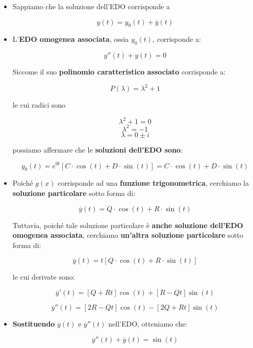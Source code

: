 \documentclass[a4paper, 12pt]{report}
\begin{document}
\begin{itemize}
        \begin{itemize}
            \item Sappiamo che la soluzione dell'EDO corrisponde a
            
            \[ y(t) = y_0(t) + \overline{y}(t)\]
            
            \item  L'\textbf{EDO omogenea associata}, ossia $y_0(t)$, corrisponde a:
            
            \[y''(t)+y(t)=0 \]
            
            Siccome il suo \textbf{polinomio caratteristico associato} corrisponde a:
            
            \[P(\lambda) = \lambda^2 + 1 \]
            
            le cui radici sono
            
            \[ \lambda^2 + 1 = 0\]
            \[ \lambda^2 = -1\]
            \[ \lambda = 0 \pm i\]
            
            possiamo affermare che le \textbf{soluzioni dell'EDO sono}:
            
            \[ y_0(t) = e^{0t}[C \cdot \cos(t) + D \cdot \sin(t)] = C \cdot \cos(t) + D \cdot \sin(t)\]
            
            \item Poiché $g(x)$ corrisponde ad una \textbf{funzione trigonometrica}, cerchiamo la \textbf{soluzione particolare} sotto forma di:
            
            \[ \overline{y}(t) = Q \cdot \cos(t) + R \cdot \sin(t)\]
            
            Tuttavia, poiché tale soluzione particolare è \textbf{anche soluzione dell'EDO omogenea associata}, cerchiamo \textbf{un'altra soluzione particolare} sotto forma di:
            
            \[ \overline{y}(t) = t[Q \cdot \cos(t) + R \cdot \sin(t)]\]
            
            le cui derivate sono:
            
            \[ \overline{y}'(t)  = [Q+Rt]\cos(t)+[R-Qt]\sin(t)\]
            
            \[ \overline{y}''(t) = [2R-Qt]\cos(t)-[2Q+Rt]\sin(t)\]
            
            \item \textbf{Sostituendo} $\overline{y}(t)$ e $\overline{y}''(t)$ nell'EDO, otteniamo che:
            
            \[ \overline{y}''(t)+\overline{y}(t)=\sin(t)\]
            

\end{itemize}
\end{itemize}
\end{document}
